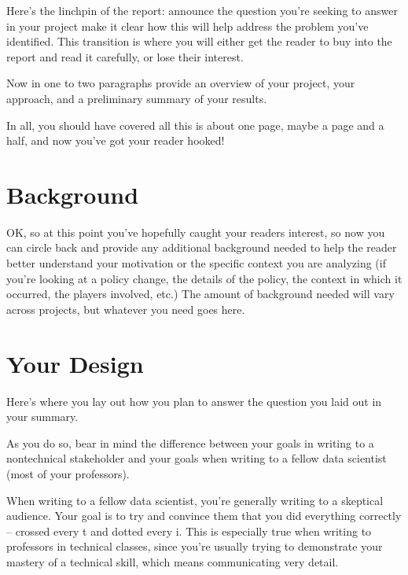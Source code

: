 \documentclass[letterpaper,10pt,english]{jupyterBook}
\begin{document}
\sphinxAtStartPar
{}

\sphinxAtStartPar
Here’s the linchpin of the report: announce the question you’re seeking to answer in your project  make it clear how this will help address the problem you’ve identified. This transition is where you will either get the reader to buy into the report and read it carefully, or lose their interest.

\sphinxAtStartPar
{}

\sphinxAtStartPar
Now in one to two paragraphs provide an overview of your project, your approach, and a preliminary summary of your results.

\sphinxAtStartPar
In all, you should have covered all this is about one page, maybe a page and a half, and  now you’ve got your reader hooked!


\section{Background}
\label{\detokenize{40_in_practice/25_writing_to_stakeholders:background}}
\sphinxAtStartPar
OK, so at this point you’ve hopefully caught your readers interest, so now you can circle back and provide any additional background needed to help the reader better understand your motivation or the specific context you are analyzing (if you’re looking at a policy change, the details of the policy, the context in which it occurred, the players involved, etc.) The amount of background needed will vary across projects, but whatever you need goes here.


\section{Your Design}
\label{\detokenize{40_in_practice/25_writing_to_stakeholders:your-design}}
\sphinxAtStartPar
Here’s where you lay out how you plan to answer the question you laid out in your summary.

\sphinxAtStartPar
As you do so, bear in mind the difference between your goals in writing to a non\sphinxhyphen{}technical stakeholder and your goals when writing to a fellow data scientist (most of your professors).

\sphinxAtStartPar
When writing to a fellow data scientist, you’re generally writing to a skeptical audience. Your goal is to try and convince them that you did everything correctly – crossed every t and dotted every i. This is especially true when writing to professors in technical classes, since you’re usually trying to demonstrate your mastery of a technical skill, which means communicating very detail.
\end{document}
